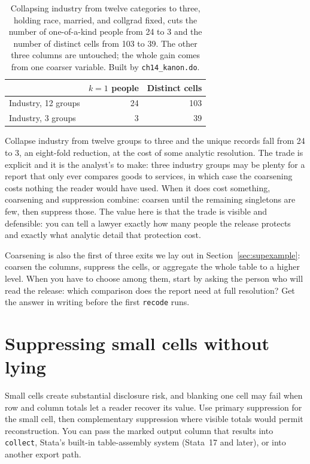 \begin{table}[htbp]
\centering
{\footnotesize
\begin{tabular}{lrr}
\hline
                       & $k=1$ people & Distinct cells \\
\hline
Industry, 12 groups    & 24 & 103 \\
Industry, 3 groups     &  3 &  39 \\
\hline
\end{tabular}
}
\caption[Coarsening industry collapses unique records]{Collapsing industry from twelve categories to three, holding race, married, and collgrad fixed, cuts the number of one-of-a-kind people from 24 to 3 and the number of distinct cells from 103 to 39. The other three columns are untouched; the whole gain comes from one coarser variable. Built by \texttt{ch14\_kanon.do}.}
\label{tab:coarsen}
\end{table}

Collapse industry from twelve groups to three and the unique records fall from 24 to 3, an eight-fold reduction, at the cost of some analytic resolution.  The trade is explicit and it is the analyst's to make: three industry groups may be plenty for a report that only ever compares goods to services, in which case the coarsening costs nothing the reader would have used. When it does cost something, coarsening and suppression combine: coarsen until the remaining singletons are few, then suppress those. The value here is that the trade is visible and defensible: you can tell a lawyer exactly how many people the release protects and exactly what analytic detail that protection cost.

Coarsening is also the first of three exits we lay out in Section~\ref{sec:supexample}: coarsen the columns, suppress the cells, or aggregate the whole table to a higher level. When you have to choose among them, start by asking the person who will read the release: which comparison does the report need at full resolution? Get the answer in writing before the first \texttt{recode} runs.

\section{Suppressing small cells without lying}\label{sec:suppress}
Small cells create substantial disclosure risk, and blanking one cell may fail when row and column totals let a reader recover its value. Use primary suppression for the small cell, then complementary suppression where visible totals would permit reconstruction. You can pass the marked output column that results into \texttt{collect}, Stata's built-in table-assembly system (Stata~17 and later), or into another export path.

